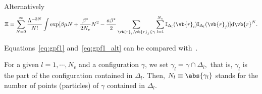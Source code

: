\begin{mdframed}[linecolor=black,linewidth=1pt,leftline=true]
	Alternatively
	\begin{equation}
		\label{eq:gpf1_alt}
		\Xi = \sum_{N=0}^{\infty} \frac{\Lambda^{-3N}}{N!}
		\int
		\exp[\beta\mu N + \frac{\beta^*}{2N_{v}} N^2 - \frac{a\beta^*}{2} \sum_{\vb{r}_i,\vb{r}_j \in \gamma} \sum_{l=1}^{N_v} \mathbb{I}_{\Delta_l}(\vb{r}_i)\mathbb{I}_{\Delta_l}(\vb{r}_j)] {\rm d} \vb{r}^N.
	\end{equation}
\end{mdframed}
Equations~\eqref{eq:gpf1} and~\eqref{eq:gpf1_alt} can be compared with~\cite[(2.5)]{KKD20}.

For a given $l = 1, \cdots , N_v$ and a configuration $\gamma$, we set $\gamma_l = \gamma \cap \Delta_l,$ that is, $\gamma_l$ is the part of the configuration contained in $\Delta_l$. Then, $N_l \equiv \abs{\gamma_l}$ stands for the number of points (particles) of $\gamma$ contained in $\Delta_l$.

